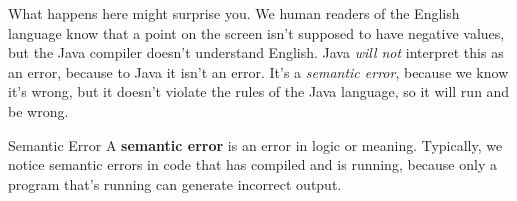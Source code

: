 What happens here might surprise you.  We human readers of the English language know that a point on the screen isn't supposed to have negative values, but the Java compiler doesn't understand English.  Java \textit{will not} interpret this as an error, because to Java it isn't an error.  It's a \textit{semantic error}, because we know it's wrong, but it doesn't violate the rules of the Java language, so it will run and be wrong.

\begin{defn}{Semantic Error}
    A \textbf{semantic error} is an error in logic or meaning.  Typically, we notice semantic errors in code that has compiled and is running, because only a program that's running can generate incorrect output.
\end{defn}


